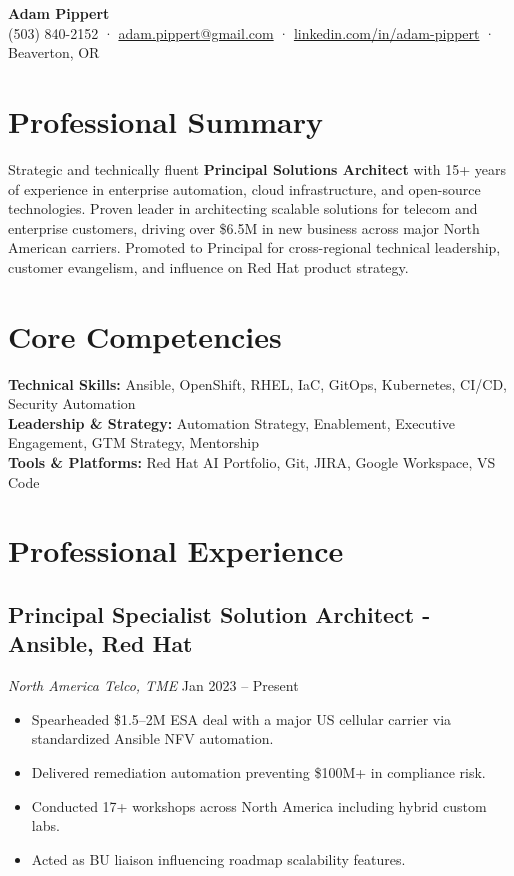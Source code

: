 \documentclass[11pt]{article}
\begin{document}
\begin{center}
    {\Huge \textbf{Adam Pippert}} \\
    (503) 840-2152 · \href{mailto:adam.pippert@gmail.com}{adam.pippert@gmail.com} · 
    \href{https://www.linkedin.com/in/adam-pippert}{linkedin.com/in/adam-pippert} · Beaverton, OR
\end{center}

\vspace{1em}

\section*{Professional Summary}
Strategic and technically fluent \textbf{Principal Solutions Architect} with 15+ years of experience in enterprise automation, cloud infrastructure, and open-source technologies. Proven leader in architecting scalable solutions for telecom and enterprise customers, driving over \$6.5M in new business across major North American carriers. Promoted to Principal for cross-regional technical leadership, customer evangelism, and influence on Red Hat product strategy.

\section*{Core Competencies}
\textbf{Technical Skills:} Ansible, OpenShift, RHEL, IaC, GitOps, Kubernetes, CI/CD, Security Automation \\
\textbf{Leadership \& Strategy:} Automation Strategy, Enablement, Executive Engagement, GTM Strategy, Mentorship \\
\textbf{Tools \& Platforms:} Red Hat AI Portfolio, Git, JIRA, Google Workspace, VS Code

\section*{Professional Experience}

\subsection{Principal Specialist Solution Architect - Ansible, Red Hat}
\textit{North America Telco, TME} \hfill Jan 2023 -- Present
\begin{itemize}[leftmargin=*]
    \item Spearheaded \$1.5--2M ESA deal with a major US cellular carrier via standardized Ansible NFV automation.
    \item Delivered remediation automation preventing \$100M+ in compliance risk.
    \item Conducted 17+ workshops across North America including hybrid custom labs.
    \item Acted as BU liaison influencing roadmap scalability features.
\end{itemize}
\end{document}
